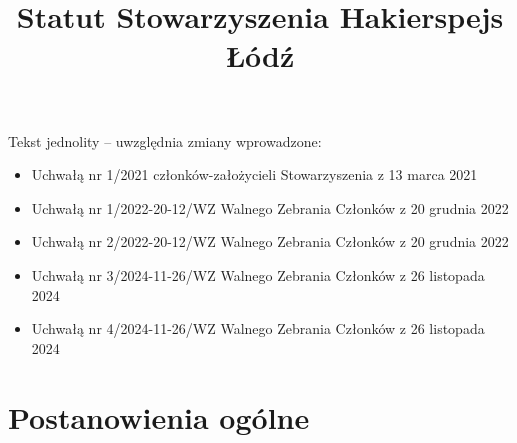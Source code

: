 \documentclass[chapterprefix,notitlepage]{article}
\begin{document}
\title{Statut Stowarzyszenia Hakierspejs Łódź}
\author{}
\date{}

\maketitle

\large Tekst jednolity – uwzględnia zmiany wprowadzone:
\begin{itemize}
\item Uchwałą nr 1/2021 członków-założycieli Stowarzyszenia z 13 marca 2021
\item Uchwałą nr 1/2022-20-12/WZ Walnego Zebrania Członków z 20 grudnia 2022
\item Uchwałą nr 2/2022-20-12/WZ Walnego Zebrania Członków z 20 grudnia 2022
\item Uchwałą nr 3/2024-11-26/WZ Walnego Zebrania Członków z 26 listopada 2024
\item Uchwałą nr 4/2024-11-26/WZ Walnego Zebrania Członków z 26 listopada 2024
\end{itemize} 

\section{Postanowienia ogólne}
\end{document}
